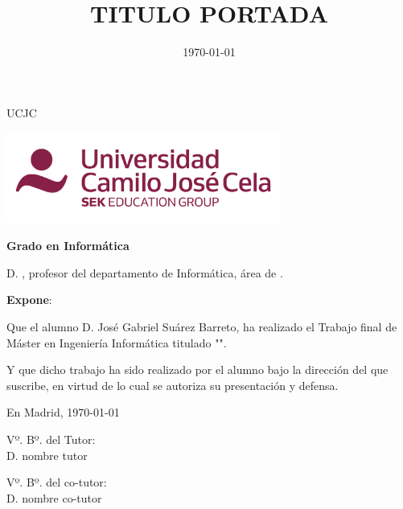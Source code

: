 \documentclass[a4paper,12pt,oneside,oldfontcommands]{memoir}
\title{TITULO PORTADA}
\author{\nombre}
\date{\today}
\newcommand{\nombre}[0]{José Gabriel Suárez Barreto} %
\newcommand{\depto}[0]{Informática}
\newcommand{\areac}[0]{}
\begin{document}
\maketitle


\newpage\null\thispagestyle{empty}\newpage


\thispagestyle{empty}


\noindent
\begin{center}%
	{\noindent\Huge UCJC}\vspace{.5cm}%
	
\begin{center}%
	\includegraphics[height=3cm]{img/escudoUCJC} \hspace{1cm}
\end{center}%

	{\noindent\Large \textbf{Grado en Informática}}\vspace{.5cm}%
\end{center}%



\noindent D. \makeatletter\@tutor\makeatother, profesor del departamento de \depto, área de \areac.

\noindent \textbf{Expone}:

\noindent Que el alumno D. \nombre, %
ha realizado el Trabajo final de Máster en Ingeniería Informática titulado "\makeatletter\textsc{\@title{}}\makeatother". 

\noindent Y que dicho trabajo ha sido realizado por el alumno bajo la dirección del que suscribe, en virtud de lo cual se autoriza su presentación y defensa.

\begin{center} %
En Madrid, {\large \today}
\end{center}

\vfill\vfill\vfill

\begin{minipage}{0.45\textwidth}
\begin{flushleft} %
Vº. Bº. del Tutor:\\[2cm]
D. nombre tutor
\end{flushleft}
\end{minipage}
\hfill
\begin{minipage}{0.45\textwidth}
\begin{flushleft} %
Vº. Bº. del co-tutor:\\[2cm]
D. nombre co-tutor
\end{flushleft}
\end{minipage}
\hfill
\end{document}
